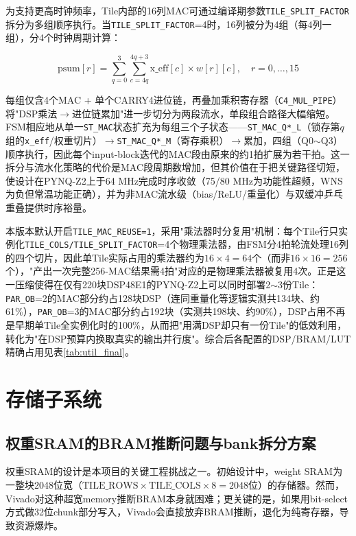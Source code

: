\documentclass[bachelor,compact,nofont]{xjtuthesis}
\numberwithin{equation}{chapter}
\begin{document}
为支持更高时钟频率，Tile内部的16列MAC可通过编译期参数\texttt{TILE\_SPLIT\_FACTOR}拆分为多组顺序执行。当\texttt{TILE\_SPLIT\_FACTOR}=4时，16列被分为4组（每4列一组），分4个时钟周期计算：

\begin{equation}
	\text{psum}[r] = \sum_{q=0}^{3} \sum_{c=4q}^{4q+3} \text{x\_eff}[c] \times w[r][c], \quad r = 0, \ldots, 15
\end{equation}

每组仅含4个MAC + 单个CARRY4进位链，再叠加乘积寄存器（\texttt{C4\_MUL\_PIPE}）将"DSP乘法$\to$进位链累加"进一步切分为两段流水，单段组合路径大幅缩短。FSM相应地从单一\texttt{ST\_MAC}状态扩充为每组三个子状态——\texttt{ST\_MAC\_Q*\_L}（锁存第$q$组的\texttt{x\_eff}/权重切片）$\to$\texttt{ST\_MAC\_Q*\_M}（寄存乘积）$\to$累加，四组（Q0$\sim$Q3）顺序执行，因此每个input-block迭代的MAC段由原来的约1拍扩展为若干拍。这一拆分与流水化策略的代价是MAC段周期数增加，但其价值在于把关键路径切短，使设计在PYNQ-Z2上于64 MHz完成时序收敛（75/80 MHz为功能性超频，WNS为负但常温功能正确），并为非MAC流水级（bias/ReLU/重量化）与双缓冲乒乓重叠提供时序裕量。

本版本默认开启\texttt{TILE\_MAC\_REUSE=1}，采用"乘法器时分复用"机制：每个Tile行只实例化\texttt{TILE\_COLS/TILE\_SPLIT\_FACTOR}=4个物理乘法器，由FSM分4拍轮流处理16列的四个切片，因此单Tile实际占用的乘法器约为$16\times4=64$个（而非$16\times16=256$个），"产出一次完整256-MAC结果需4拍"对应的是物理乘法器被复用4次。正是这一压缩使得在仅有220块DSP48E1的PYNQ-Z2上可以同时部署2$\sim$3份Tile：\texttt{PAR\_OB}=2的MAC部分约占128块DSP（连同重量化等逻辑实测共134块、约61\%），\texttt{PAR\_OB}=3的MAC部分约占192块（实测共198块、约90\%），DSP占用不再是早期单Tile全实例化时的100\%，从而把"用满DSP却只有一份Tile"的低效利用，转化为"在DSP预算内换取真实的输出并行度"。综合后各配置的DSP/BRAM/LUT精确占用见表\ref{tab:util_final}。

\section{存储子系统}

\subsection{权重SRAM的BRAM推断问题与bank拆分方案}

权重SRAM的设计是本项目的关键工程挑战之一。初始设计中，weight SRAM为一整块2048位宽（$\text{TILE\_ROWS} \times \text{TILE\_COLS} \times 8 = 2048$位）的存储器。然而，Vivado对这种超宽memory推断BRAM本身就困难；更关键的是，如果用bit-select方式做32位chunk部分写入，Vivado会直接放弃BRAM推断，退化为纯寄存器，导致资源爆炸。
\end{document}
